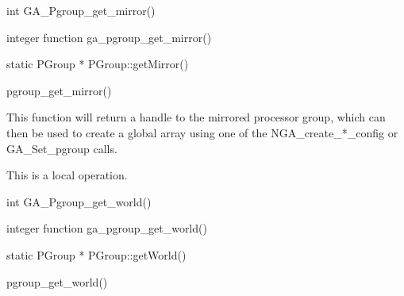 \documentclass[12pt]{article}
\begin{document}

\begin{capi}
\begin{ccode}
int GA_Pgroup_get_mirror()
\end{ccode}
\end{capi}

\begin{fapi}
\begin{fcode}
integer function ga_pgroup_get_mirror()
\end{fcode}
\end{fapi}

\begin{cxxapi}
\begin{cxxcode}
static PGroup * PGroup::getMirror()
\end{cxxcode}
\end{cxxapi}

\begin{pyapi}
\begin{pycode}
pgroup_get_mirror() 
\end{pycode}
\end{pyapi} 


\begin{desc}

This function will return a handle to the mirrored processor group, which can then be used to create a global array using one of the NGA_create_*_config or GA_Set_pgroup calls.

This is a local operation. 
\end{desc}


\begin{capi}
\begin{ccode}
int GA_Pgroup_get_world()
\end{ccode}
\end{capi}

\begin{fapi}
\begin{fcode}
integer function ga_pgroup_get_world()
\end{fcode}
\end{fapi}

\begin{cxxapi}
\begin{cxxcode}
static PGroup * PGroup::getWorld()
\end{cxxcode}
\end{cxxapi}

\begin{pyapi}
\begin{pycode}
pgroup_get_world() 
\end{pycode}
\end{pyapi} 
\end{document}
